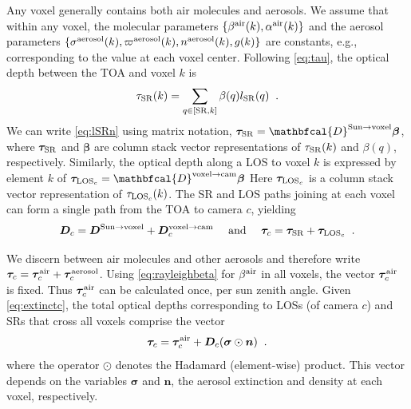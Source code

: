 \documentclass[10pt,letterpaper]{article}
\newcommand{\OpDistance}{\mathbfcal{D}}
\newcommand{\vect}[1]{\bm{#1}}
\begin{document}
Any voxel generally contains both air molecules and aerosols.  We assume that within any voxel, the
molecular parameters $\{ \beta^{\rm air}(k),\alpha^{\rm air}(k)\}$ and
the aerosol parameters $\{ \sigma^{\rm aerosol}(k),\varpi^{\rm
  aerosol}(k), n^{\rm aerosol}(k),g(k)\}$ are constants, e.g.,
corresponding to the value at each voxel center.
Following \cref{eq:tau}, the optical depth between the TOA
and voxel $k$ is
\begin{equation}
  \tau_{\rm SR}(k)= \sum_{q \in[{\rm SR},k]} \beta(q) l_{\rm SR}(q) \;\;.
  \label{eq:lSRn}
\end{equation}
We can write \cref{eq:lSRn} using matrix notation,
  $\vect{\tau}_{\rm SR}=\OpDistance^{\mathrm{Sun \rightarrow voxel}} \vect{\beta}$,
where $\vect{\tau}_{\rm SR}$ and $\vect{\beta}$ are column stack vector
representations of $\tau_{\rm SR}(k)$ and $\beta(q)$, respectively. Similarly,
the optical depth along a LOS to voxel $k$ is expressed by element $k$ of
  $\vect{\tau}_{{\rm LOS}_c} = \OpDistance^{\mathrm{voxel \rightarrow
      cam}} \vect{\beta}$
Here $\vect{\tau}_{{\rm LOS}_c}$ is a column stack vector representation of
$\tau_{{\rm LOS}_c}(k)$.  The SR and LOS paths joining at each voxel can
form a single path from the TOA to camera $c$, yielding
\begin{equation}
  {\bm D}_c=
  {\bm D}^{\mathrm{Sun \rightarrow voxel}}+
  {\bm D}^{\mathrm{voxel \rightarrow cam}}_c
  \quad\text{ and }\quad
  \vect{\tau}_c=
  \vect{\tau}_{\rm SR}+
  \vect{\tau}_{{\rm LOS}_c}
  \;\;.
  \label{eq:D_tau_total}
\end{equation}

We discern between air molecules and other aerosols and therefore
write $ \vect{\tau}_c= \vect{\tau}_c^{\rm air} + \vect{\tau}_c^{\rm
  aerosol}$.  Using \cref{eq:rayleighbeta} for $\beta^{\rm air}$ in
all voxels, the vector $\vect{\tau}_c^{\rm air}$ is fixed. Thus
$\vect{\tau}_c^{\rm air}$ can be calculated once, per sun zenith
angle. Given \cref{eq:extinctc}, the total optical depths
corresponding to LOSs (of camera $c$) and SRs that cross all voxels
comprise the vector
\begin{equation}
  \vect{\tau}_c= \vect{\tau}_c^{\rm air}
  + {\bm D}_c (\vect{\sigma} \odot {\bm n})
  \;\;.
  \label{eq:tautotal}
\end{equation}
where the operator $\odot$ denotes the Hadamard (element-wise)
product. This vector depends on the variables $\vect{\sigma}$ and
${\bm n}$, the aerosol extinction and density at each voxel,
respectively.
\end{document}
